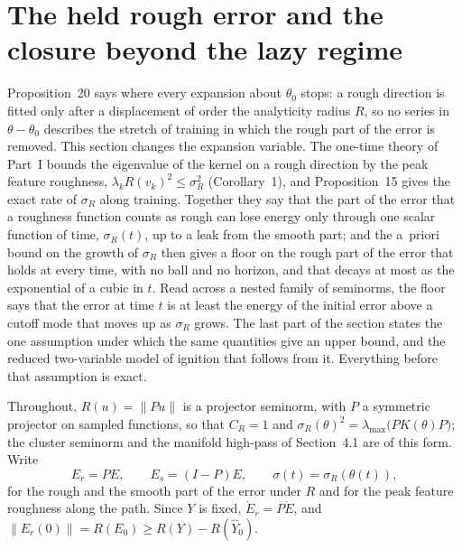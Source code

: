 %

\section{The held rough error and the closure beyond the lazy regime}
\label{sec:held-rough}

Proposition~20 says where every expansion about $\theta_0$ stops: a rough
direction is fitted only after a displacement of order the analyticity radius
$R$, so no series in $\theta-\theta_0$ describes the stretch of training in
which the rough part of the error is removed. This section changes the
expansion variable. The one-time theory of Part~I bounds the eigenvalue of the
kernel on a rough direction by the peak feature roughness,
$\lambda_k R(v_k)^2 \le \sigma_R^2$ (Corollary~1), and Proposition~15 gives the
exact rate of $\sigma_R$ along training. Together they say that the part of
the error that a roughness function counts as rough can lose energy only
through one scalar function of time, $\sigma_R(t)$, up to a leak from the
smooth part; and the a~priori bound on the growth of $\sigma_R$ then gives a
floor on the rough part of the error that holds at every time, with no ball
and no horizon, and that decays at most as the exponential of a cubic in $t$.
Read across a nested family of seminorms, the floor says that the error at
time $t$ is at least the energy of the initial error above a cutoff mode that
moves up as $\sigma_R$ grows. The last part of the section states the one
assumption under which the same quantities give an upper bound, and the
reduced two-variable model of ignition that follows from it. Everything
before that assumption is exact.

Throughout, $R(u)=\|Pu\|$ is a projector seminorm, with $P$ a symmetric
projector on sampled functions, so that $C_R=1$ and
$\sigma_R(\theta)^2=\lambda_{\max}\big(PK(\theta)P\big)$; the cluster seminorm
and the manifold high-pass of Section~4.1 are of this form. Write
\begin{equation}
E_r = PE, \qquad E_s = (I-P)E, \qquad \sigma(t)=\sigma_R(\theta(t)),
\label{eq:split-rs}
\end{equation}
for the rough and the smooth part of the error under $R$ and for the peak
feature roughness along the path. Since $Y$ is fixed, $\dot E_r = P\dot E$,
and $\|E_r(0)\| = R(E_0) \ge R(Y)-R(\hat Y_0)$.

